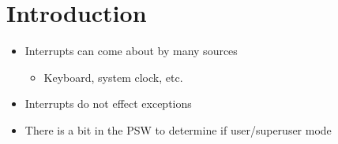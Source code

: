 \documentclass[12pt]{article}
\begin{document}
\section{Introduction}

\begin{itemize}
    \item Interrupts can come about by many sources
    \begin{itemize}
        \item Keyboard, system clock, etc.
    \end{itemize}

    \item Interrupts do not effect exceptions
    \item There is a bit in the PSW to determine if user/superuser mode
\end{itemize}
\end{document}
